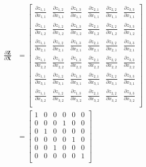 \documentclass{article}
\newcommand{\matr}[1]{\mathbf{#1}} %
\begin{document}
\begin{align}
\frac{\partial \matr{Z}}{\partial \matr{X}} &=
\begin{bmatrix}
\frac{\partial z_{1,1}}{\partial x_{1,1}} & \frac{\partial z_{1,2}}{\partial x_{1,1}} & \frac{\partial z_{1,3}}{\partial x_{1,1}} & \frac{\partial z_{2,1}}{\partial x_{1,1}} & \frac{\partial z_{2,2}}{\partial x_{1,1}} & \frac{\partial z_{3,3}}{\partial x_{1,1}}\\[0.7em]
\frac{\partial z_{1,1}}{\partial x_{1,2}} & \frac{\partial z_{1,2}}{\partial x_{1,2}} & \frac{\partial z_{1,3}}{\partial x_{1,2}} & \frac{\partial z_{2,1}}{\partial x_{1,2}} & \frac{\partial z_{2,2}}{\partial x_{1,2}} & \frac{\partial z_{3,3}}{\partial x_{1,2}}\\[0.7em]
\frac{\partial z_{1,1}}{\partial x_{2,1}} & \frac{\partial z_{1,2}}{\partial x_{2,1}} & \frac{\partial z_{1,3}}{\partial x_{2,1}} & \frac{\partial z_{2,1}}{\partial x_{2,1}} & \frac{\partial z_{2,2}}{\partial x_{2,1}} & \frac{\partial z_{3,3}}{\partial x_{2,1}}\\[0.7em]
\frac{\partial z_{1,1}}{\partial x_{2,2}} & \frac{\partial z_{1,2}}{\partial x_{2,2}} & \frac{\partial z_{1,3}}{\partial x_{2,2}} & \frac{\partial z_{2,1}}{\partial x_{2,2}} & \frac{\partial z_{2,2}}{\partial x_{2,2}} & \frac{\partial z_{3,3}}{\partial x_{2,2}}\\[0.7em]
\frac{\partial z_{1,1}}{\partial x_{3,1}} & \frac{\partial z_{1,2}}{\partial x_{3,1}} & \frac{\partial z_{1,3}}{\partial x_{3,1}} & \frac{\partial z_{2,1}}{\partial x_{3,1}} & \frac{\partial z_{2,2}}{\partial x_{3,1}} & \frac{\partial z_{3,3}}{\partial x_{3,1}}\\[0.7em]
\frac{\partial z_{1,1}}{\partial x_{3,2}} & \frac{\partial z_{1,2}}{\partial x_{3,2}} & \frac{\partial z_{1,3}}{\partial x_{3,2}} & \frac{\partial z_{2,1}}{\partial x_{3,2}} & \frac{\partial z_{2,2}}{\partial x_{3,2}} & \frac{\partial z_{3,3}}{\partial x_{3,2}}\\[0.7em]
\end{bmatrix} \nonumber
\\ \label{dZbydX_transpose}
&=
\begin{bmatrix}
1 & 0 & 0 & 0 & 0 & 0 \\%
0 & 0 & 0 & 1 & 0 & 0 \\%
0 & 1 & 0 & 0 & 0 & 0 \\%
0 & 0 & 0 & 0 & 1 & 0 \\%
0 & 0 & 1 & 0 & 0 & 0 \\%
0 & 0 & 0 & 0 & 0 & 1 \\%
\end{bmatrix}
\end{align}
\end{document}
